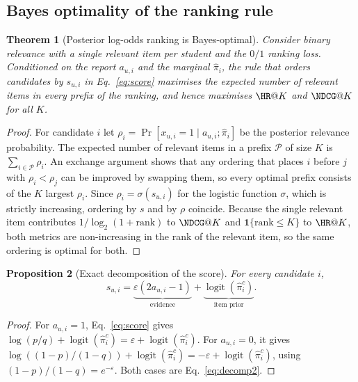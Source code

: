 \documentclass[pdflatex,sn-basic,Numbered]{sn-jnl}
\theoremstyle{plain}
\newtheorem{theorem}{Theorem}
\newtheorem{proposition}[theorem]{Proposition}
\theoremstyle{remark}
\theoremstyle{definition}
\newcommand{\eps}{\varepsilon}
\newcommand{\Prob}{\Pr}
\newcommand{\logit}{\operatorname{logit}}
\begin{document}
\subsection{Bayes optimality of the ranking rule}\label{sec:bayes}

\begin{theorem}[Posterior log-odds ranking is Bayes-optimal]\label{thm:bayes}
Consider binary relevance with a single relevant item per student and the $\mathrm{0/1}$ ranking loss. Conditioned on the report $a_{u,i}$ and the marginal $\hat\pi_i$, the rule that orders candidates by $s_{u,i}$ in Eq.~\eqref{eq:score} maximises the expected number of relevant items in every prefix of the ranking, and hence maximises $\HR@K$ and $\NDCG@K$ for all $K$.
\end{theorem}

\begin{proof}
For candidate $i$ let $\rho_i=\Prob[x_{u,i}=1\mid a_{u,i};\hat\pi_i]$ be the posterior relevance probability. The expected number of relevant items in a prefix $\mathcal{P}$ of size $K$ is $\sum_{i\in\mathcal{P}}\rho_i$. An exchange argument shows that any ordering that places $i$ before $j$ with $\rho_i<\rho_j$ can be improved by swapping them, so every optimal prefix consists of the $K$ largest $\rho_i$. Since $\rho_i=\sigma(s_{u,i})$ for the logistic function $\sigma$, which is strictly increasing, ordering by $s$ and by $\rho$ coincide. Because the single relevant item contributes $1/\log_2(1+\text{rank})$ to $\NDCG@K$ and $\mathbf 1\{\text{rank}\le K\}$ to $\HR@K$, both metrics are non-increasing in the rank of the relevant item, so the same ordering is optimal for both.
\end{proof}

\begin{proposition}[Exact decomposition of the score]\label{prop:decomposition}
For every candidate $i$,
\begin{equation}\label{eq:decomp2}
s_{u,i}=\underbrace{\eps(2a_{u,i}-1)}_{\text{evidence}}\!+\!\underbrace{\logit(\hat\pi_i^{c})}_{\text{item prior}}.
\end{equation}
\end{proposition}

\begin{proof}
For $a_{u,i}=1$, Eq.~\eqref{eq:score} gives $\log(p/q)+\logit(\hat\pi_i^{c})=\eps+\logit(\hat\pi_i^{c})$. For $a_{u,i}=0$, it gives $\log((1-p)/(1-q))+\logit(\hat\pi_i^{c})=-\eps+\logit(\hat\pi_i^{c})$, using $(1-p)/(1-q)=e^{-\eps}$. Both cases are Eq.~\eqref{eq:decomp2}.
\end{proof}
\end{document}
